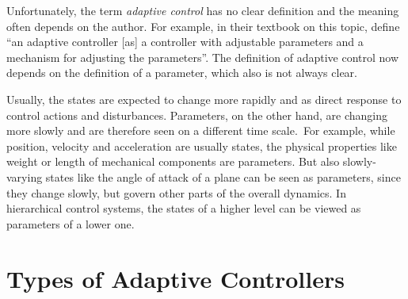 Unfortunately, the term \emph{adaptive control} has no clear definition and the
meaning often depends on the author. For example, in their textbook on
this topic, \textcite{Astrom.Wittenmark:1994:Adaptive} define ``an adaptive
controller [as] a controller with adjustable parameters and a mechanism for
adjusting the parameters''. The definition of adaptive control now depends on
the definition of a parameter, which also is not always clear.

Usually, the states are expected to change more rapidly and as direct response
to control actions and disturbances. Parameters, on the other hand, are
changing more slowly and are therefore seen on a different time
scale.~\cite[]{Filatov.Unbehauen:2004:Adaptive}\iss For example, while
position, velocity and acceleration are usually states, the physical properties
like weight or length of mechanical components are parameters. But also
slowly-varying states like the angle of attack of a plane can be seen as
parameters, since they change slowly, but govern other parts of the overall
dynamics. In hierarchical control systems, the states of a higher level can be
viewed as parameters of a lower one.

\section{Types of Adaptive Controllers}

